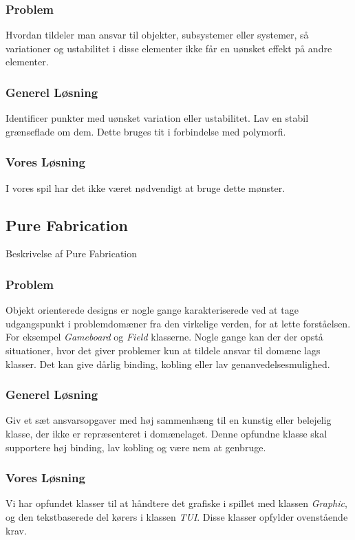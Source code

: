 \subsubsection*{Problem}
Hvordan tildeler man ansvar til objekter, subsystemer eller systemer, så variationer og ustabilitet i disse elementer ikke får en uønsket effekt på andre elementer.
\subsubsection*{Generel Løsning}
Identificer punkter med uønsket variation eller ustabilitet. Lav en stabil grænseflade om dem. Dette bruges tit i forbindelse med polymorfi.
\subsubsection*{Vores Løsning}
I vores spil har det ikke været nødvendigt at bruge dette mønster.
\subsection{Pure Fabrication}
Beskrivelse af Pure Fabrication
\subsubsection*{Problem}
Objekt orienterede designs er nogle gange karakteriserede ved at tage udgangspunkt i problemdomæner fra den virkelige verden, for at lette forståelsen. For eksempel \textit{Gameboard} og \textit{Field} klasserne. Nogle gange kan der der opstå situationer, hvor det giver problemer kun at tildele ansvar til domæne lags klasser. Det kan give dårlig binding, kobling eller lav genanvedelsesmulighed.
\subsubsection*{Generel Løsning}
Giv et sæt ansvarsopgaver med høj sammenhæng til en kunstig eller belejelig klasse, der ikke er repræsenteret i domænelaget. Denne opfundne klasse skal supportere høj binding, lav kobling og være nem at genbruge.
\subsubsection*{Vores Løsning}
Vi har opfundet klasser til at håndtere det grafiske i spillet med klassen \textit{Graphic}, og den tekstbaserede del kørers i klassen \textit{TUI}. Disse klasser opfylder ovenstående krav.